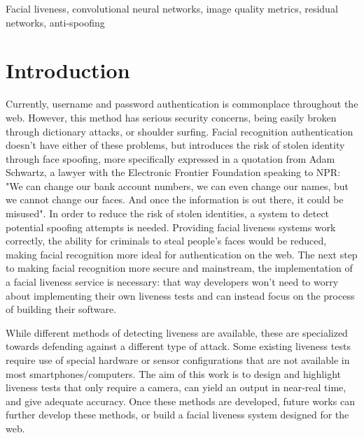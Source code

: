 \documentclass[10pt,a4paper]{article}
\begin{document}
\begin{keywords}
Facial liveness, convolutional neural networks, image quality metrics, residual networks, anti-spoofing
\end{keywords}

\section{Introduction}
    Currently, username and password authentication is commonplace throughout the web. However, this method has serious security concerns, being easily broken through dictionary attacks,
    or shoulder surfing. Facial recognition authentication doesn't have either of these problems, but introduces the risk of stolen identity through face spoofing, more specifically expressed
    in a quotation from Adam Schwartz, a lawyer with the Electronic Frontier Foundation speaking to NPR: "We can change our bank account numbers, we can even change our names, but we cannot change our faces.
    And once the information is out there, it could be misused". \cite{NPRArticle} In order to reduce the risk of stolen identities, a system to detect potential spoofing attempts is needed.
    Providing facial liveness systems work correctly, the ability for criminals to steal people's faces would be reduced, making facial recognition more ideal for authentication on the web. The next step
    to making facial recognition more secure and mainstream, the implementation of a facial liveness service is necessary: that way developers won't need to worry about implementing their own liveness tests
    and can instead focus on the process of building their software.

    While different methods of detecting liveness are available, these are specialized towards defending against a different type of attack. Some existing liveness tests require use of
    special hardware or sensor configurations that are not available in most smartphones/computers. The aim of this work is to design and highlight liveness tests that only require a camera,
    can yield an output in near-real time, and give adequate accuracy. Once these methods are developed, future works can further develop these methods, or build a facial liveness system
    designed for the web.
\end{document}
